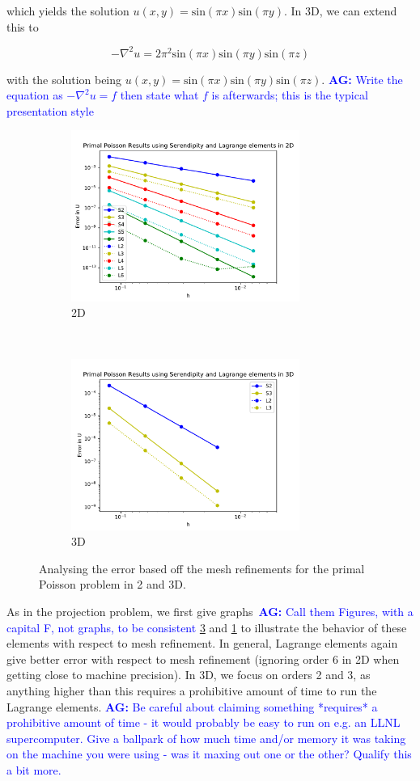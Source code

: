 \documentclass[manuscript,screen]{acmart}
\newcommand{\akg}[1]{\textcolor{blue}{\textbf{AG:} #1}}
\begin{document}
\noindent which yields the solution $u(x,y) = \text{sin}(\pi x)\text{sin}(\pi y)$.  In 3D, we can extend this to 

\[-\nabla^2 u = 2\pi^2\text{sin}(\pi x)\text{sin}(\pi y)\text{sin}(\pi z) \]

\noindent with the solution being $u(x,y) = \text{sin}(\pi x)\text{sin}(\pi y)\text{sin}(\pi z)$.  
\akg{Write the equation as $-\nabla^2 u = f$ then state what $f$ is afterwards; this is the typical presentation style}

\begin{figure}[t!]
  \centering
  \begin{subfigure}[t]{0.5\textwidth}
    \centering
    \includegraphics[height=2.2in]{2dPrimalH.pdf}
    \caption{2D}
    \label{fig:2dPrimalH}
  \end{subfigure}
  ~
  \begin{subfigure}[t]{0.5\textwidth}
    \centering
    \includegraphics[height=2.2in]{3dPrimalH.pdf}
    \caption{3D}
    \label{fig:3dPrimalH}
  \end{subfigure}
  \caption{Analysing the error based off the mesh refinements for the primal Poisson problem in 2 and 3D.}
\end{figure}  
\noindent  As in the projection problem, we first give graphs~\akg{Call them Figures, with a capital F, not graphs, to be consistent} \ref{fig:3dPrimalH} and \ref{fig:2dPrimalH} to illustrate the behavior of these elements with respect to mesh refinement.  In general, Lagrange elements again give better error with respect to mesh refinement (ignoring order 6 in 2D when getting close to machine precision).  In 3D, we focus on orders 2 and 3, as anything higher than this requires a prohibitive amount of time to run the Lagrange elements.  \akg{Be careful about claiming something *requires* a prohibitive amount of time - it would probably be easy to run on e.g. an LLNL supercomputer.  Give a ballpark of how much time and/or memory  it was taking on the machine you were using - was it maxing out one or the other? Qualify this a bit more.}
\end{document}
